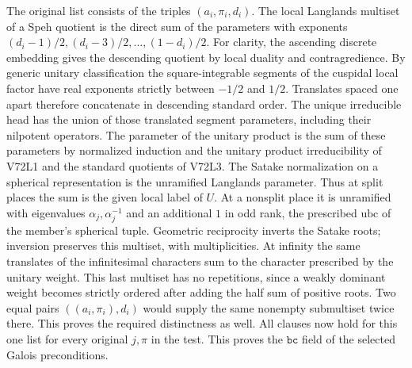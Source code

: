 The original list consists of the triples $(a_i,\pi_i,d_i)$.
The local Langlands multiset of a Speh quotient is the direct sum
of the parameters with exponents $(d_i-1)/2,(d_i-3)/2,\ldots,
(1-d_i)/2$. For clarity, the ascending discrete embedding gives the descending
quotient by local duality and contragredience. By generic unitary
classification the square-integrable segments of the cuspidal
local factor have real exponents strictly between $-1/2$ and
$1/2$. Translates spaced one apart therefore concatenate in
descending standard order. The unique irreducible head has the
union of those translated segment parameters, including their
nilpotent operators. The parameter of the unitary product
is the sum of these parameters by normalized induction and the
unitary product irreducibility of V72L1 and the standard quotients of V72L3.
The Satake normalization on a spherical representation is the
unramified Langlands parameter. Thus at split places the sum is
the given local label of $U$. At a nonsplit place it is unramified
with eigenvalues $\alpha_j,\alpha_j^{-1}$ and an additional $1$
in odd rank, the prescribed $\mathrm{ubc}$ of the member's
spherical tuple. Geometric reciprocity inverts the Satake roots;
inversion preserves this multiset, with multiplicities. At infinity the same translates of the infinitesimal
characters sum to the character prescribed by the unitary weight.
This last multiset has no repetitions, since a weakly dominant
weight becomes strictly ordered after adding the half sum of
positive roots. Two equal pairs $((a_i,\pi_i),d_i)$ would supply
the same nonempty submultiset twice there. This proves the required
distinctness as well. All clauses now hold for this one list for
every original $j,\pi$ in the test. This proves the
$\texttt{bc}$ field of the selected Galois preconditions.
